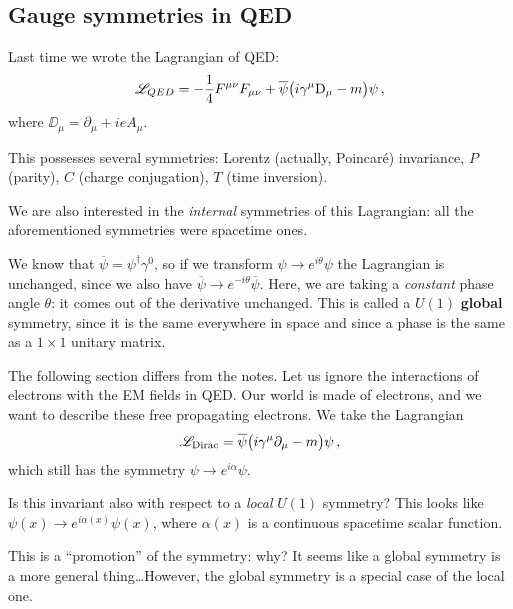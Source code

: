 \documentclass[main.tex]{subfiles}
\begin{document}
\subsection{Gauge symmetries in QED}


Last time we wrote the Lagrangian of QED: 
%
\begin{align}
\mathscr{L}_{QED} = - \frac{1}{4} F^{\mu \nu } F_{\mu \nu } 
+ \overline{\psi} \qty(i \gamma^{\mu } \mathrm{D}_{\mu } -m) \psi 
\,,
\end{align}
%
where \(\DD_{\mu } = \partial_{\mu } + i e A_{\mu }\).

This possesses several symmetries: Lorentz (actually, Poincaré) invariance, \(P\) (parity), \(C\) (charge conjugation), \(T\) (time inversion). 

We are also interested in the \emph{internal} symmetries of this Lagrangian: all the aforementioned symmetries were spacetime ones.

We know that \(\overline{\psi} = \psi ^\dag \gamma^{0}\), so if we transform \(\psi \to e^{i \theta } \psi \) the Lagrangian is unchanged, since we also have \(\overline{\psi} \to e^{-i \theta } \overline{\psi} \).
Here, we are taking a \emph{constant} phase angle \(\theta \): it comes out of the derivative unchanged. 
This is called a \(U(1)\) \textbf{global} symmetry, since it is the same everywhere in space and since a phase is the same as a \(1 \times 1 \) unitary matrix.

The following section differs from the notes. 
Let us ignore the interactions of electrons with the EM fields in QED. 
Our world is made of electrons, and we want to describe these free propagating electrons. 
We take the Lagrangian 
%
\begin{align}
\mathscr{L}_{\text{Dirac}} = \overline{\psi} \qty(i \gamma^{\mu } \partial_{\mu }  -m) \psi 
\,,
\end{align}
%
which still has the symmetry \(\psi \to e^{i \alpha } \psi \). 

Is this invariant also with respect to a \emph{local} \(U(1)\) symmetry? This looks like \(\psi (x) \to e^{i \alpha (x)} \psi (x)\), where \(\alpha (x)\) is a continuous spacetime scalar function. 

This is a ``promotion'' of the symmetry: why? It seems like a global symmetry is a more general thing\dots However, the global symmetry is a special case of the local one. 
\end{document}
